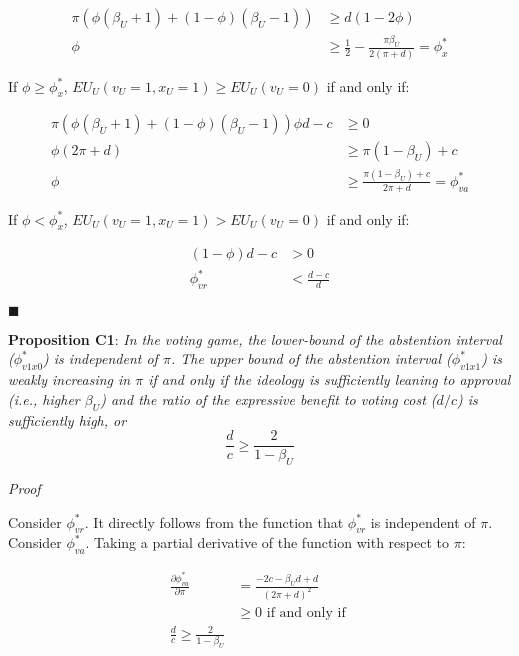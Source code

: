 \begin{align*}
	\pi ( \phi(\beta_U+1) + (1-\phi)(\beta_U-1)) &\geq d (1-2\phi) \\
	\phi &\geq \frac{1}{2} - \frac{\pi \beta_U}{2(\pi+d)} = \phi^*_x
\end{align*}

\par If $\phi \geq \phi^*_x$, $EU_U (v_U=1,x_U=1) \geq EU_U (v_U=0)$ if and only if:

\begin{align*}
	\pi ( \phi(\beta_U+1) + (1-\phi)(\beta_U-1)) \phi d - c&\geq 0 \\
	\phi(2\pi+d) &\geq \pi(1-\beta_U) + c \\
	\phi &\geq \frac{\pi(1-\beta_U) + c}{2\pi+d} = \phi^*_{va}
\end{align*}

\par If $\phi < \phi^*_x$, $EU_U (v_U=1,x_U=1) > EU_U (v_U=0)$ if and only if:

\begin{align*}
	(1-\phi)d - c &> 0 \\
	\phi^*_{vr} &< \frac{d-c}{d}
\end{align*}

\hfill $\blacksquare$

\noindent \textbf{Proposition C1}: \textit{In the voting game, the lower-bound of the abstention interval ($\phi^*_{v1x0}$) is independent of $\pi$. The upper bound of the abstention interval ($\phi^*_{v1x1}$) is weakly increasing in $\pi$ if and only if the ideology is sufficiently leaning to approval (i.e., higher $\beta_U$) and the ratio of the expressive benefit to voting cost ($d/c$) is sufficiently high, or}\\

$$\frac{d}{c} \geq \frac{2}{1-\beta_U}$$

\noindent \textit{Proof}

\par Consider $\phi^*_{vr}$. It directly follows from the function that $\phi^*_{vr}$ is independent of $\pi$. Consider $\phi^*_{va}$. Taking a partial derivative of the function with respect to $\pi$:

\begin{align*}
	\frac{\partial \phi^*_{va}}{\partial \pi} &= \frac{-2c - \beta_U d + d}{(2\pi + d)^2} \\
	&\geq 0 \text{ if and only if }\\
    \frac{d}{c} \geq \frac{2}{1-\beta_U} 
\end{align*}

